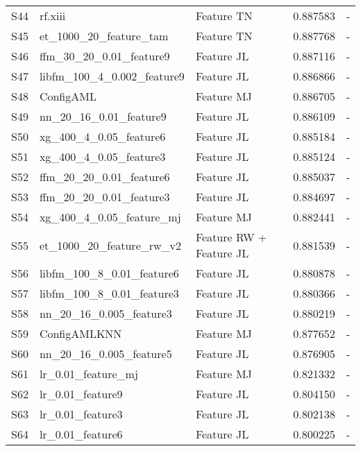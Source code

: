 \begin{table*}[t]
\begin{center}
\begin{tabular}{lllll}
S44	& rf.xiii				& Feature TN									& 0.887583	& - \\
S45	& et\_1000\_20\_feature\_tam	& Feature TN								& 0.887768	& - \\
S46 	& ffm\_30\_20\_0.01\_feature9	& Feature JL								& 0.887116	& - \\
S47	& libfm\_100\_4\_0.002\_feature9	& Feature JL							& 0.886866	& - \\
S48	& ConfigAML			& Feature MJ									& 0.886705	& - \\
S49	& nn\_20\_16\_0.01\_feature9	& Feature JL								& 0.886109	& - \\
S50 	& xg\_400\_4\_0.05\_feature6	& Feature JL								& 0.885184	& - \\
S51 	& xg\_400\_4\_0.05\_feature3	& Feature JL								& 0.885124	& - \\
S52 	& ffm\_20\_20\_0.01\_feature6	& Feature JL								& 0.885037	& - \\
S53	& ffm\_20\_20\_0.01\_feature3	& Feature JL								& 0.884697	& - \\
S54 	& xg\_400\_4\_0.05\_feature\_mj	& Feature MJ							& 0.882441	& - \\
S55	& et\_1000\_20\_feature\_rw\_v2	& Feature RW + Feature JL				& 0.881539	& - \\
S56	& libfm\_100\_8\_0.01\_feature6	& Feature JL							& 0.880878	& - \\
S57	& libfm\_100\_8\_0.01\_feature3	& Feature JL							& 0.880366	& - \\
S58	& nn\_20\_16\_0.005\_feature3	& Feature JL								& 0.880219	& - \\
S59	& ConfigAMLKNN		& Feature MJ									& 0.877652	& - \\
S60	& nn\_20\_16\_0.005\_feature5	& Feature JL								& 0.876905	& - \\
S61	& lr\_0.01\_feature\_mj		& Feature MJ								& 0.821332	& - \\
S62	& lr\_0.01\_feature9		& Feature JL									& 0.804150	& - \\
S63	& lr\_0.01\_feature3		& Feature JL									& 0.802138	& - \\
S64	& lr\_0.01\_feature6		& Feature JL									& 0.800225	& - \\
\end{tabular}
\end{center}
\end{table*}